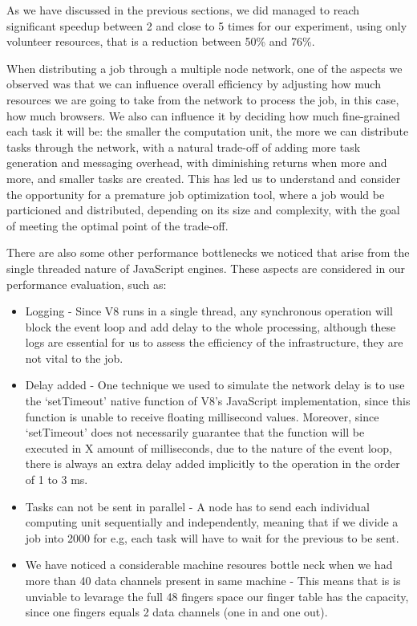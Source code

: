 As we have discussed in the previous sections, we did managed to reach significant speedup between 2 and close to 5 times for our experiment, using only volunteer resources, that is a reduction between 50\% and 76\%.

When distributing a job through a multiple node network, one of the aspects we observed was that we can influence overall efficiency by adjusting how much resources we are going to take from the network to process the job, in this case, how much browsers. We also can influence it by deciding how much fine-grained each task it will be: the smaller the computation unit, the more we can distribute tasks through the network, with a natural trade-off of adding more task generation and messaging overhead, with diminishing returns when more and more, and smaller tasks are created. This has led us to understand and consider the opportunity for a premature job optimization tool, where a job would be particioned and distributed, depending on its size and complexity, with the goal of meeting the optimal point of the trade-off.

There are also some other performance bottlenecks we noticed that arise from the single threaded nature of JavaScript engines. These aspects are considered in our performance evaluation, such as:

\begin{itemize}
  \item Logging - Since V8 runs in a single thread, any synchronous operation will block the event loop and add delay to the whole processing, although these logs are essential for us to assess the efficiency of the infrastructure, they are not vital to the job.
  \item Delay added - One technique we used to simulate the network delay is to use the `setTimeout' native function of V8's JavaScript implementation, since this function is unable to receive floating millisecond values. Moreover, since `setTimeout' does not necessarily guarantee that the function will be executed in X amount of milliseconds, due to the nature of the event loop, there is always an extra delay added implicitly to the operation in the order of 1 to 3 ms.
  \item Tasks can not be sent in parallel - A node has to send each individual computing unit sequentially and independently, meaning that if we divide a job into 2000 for e.g, each task will have to wait for the previous to be sent.
  \item We have noticed a considerable machine resoures bottle neck when we had more than 40 data channels present in same machine - This means that is is unviable to levarage the full 48 fingers space our finger table has the capacity, since one fingers equals 2 data channels (one in and one out).
\end{itemize}

